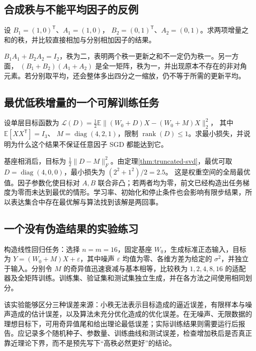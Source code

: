 \documentclass[UTF8,12pt,a4paper,fontset=fandol]{ctexart}
\begin{document}
\subsection{合成秩与不能平均因子的反例}

\begin{example}
设 $B_1=(1,0)^{\mathsf T}$、$A_1=(1,0)$，
$B_2=(0,1)^{\mathsf T}$、$A_2=(0,1)$。求两项增量之和的秩，并比较直接相加与分别相加因子的结果。
\end{example}
\begin{solve}
$B_1A_1+B_2A_2=I_2$，秩为二，表明两个秩一更新之和不一定仍为秩一。另一方面，
$(B_1+B_2)(A_1+A_2)$ 是全一矩阵，秩为一，并出现原本不存在的非对角元素。若分别取平均，还会整体多出四分之一缩放，仍不等于所需的更新平均。
\end{solve}

\subsection{最优低秩增量的一个可解训练任务}

\begin{example}
设单层目标函数为
$\mathcal L(D)=\frac12\mathbb E\|(W_0+D)X-(W_0+M)X\|_2^2$，
其中 $\mathbb E[XX^{\mathsf T}]=I_3$、
$M=\operatorname{diag}(4,2,1)$，限制 $\operatorname{rank}(D)\leq1$。求最小损失，并说明为什么这个结果不保证任意因子 SGD 都能达到它。
\end{example}
\begin{solve}
基座相消后，目标为 $\frac12\|D-M\|_F^2$。由定理\ref{thm:truncated-svd}，最优可取
$D=\operatorname{diag}(4,0,0)$，最小损失为 $(2^2+1^2)/2=2.5$。
这是权重空间的全局最优值。因子参数化使目标对 $A,B$ 联合非凸；若两者均为零，前文已经构造出任务梯度为零而未达到最优的情形。学习率、初始化和停止条件也会影响有限步结果，所以表达集合中存在最优解与算法找到该解是两回事。
\end{solve}

\subsection{一个没有伪造结果的实验练习}

构造线性回归任务：选择 $n=m=16$，固定基座 $W_0$，生成标准正态输入，目标为
$Y=(W_0+M)X+\varepsilon$，其中噪声 $\varepsilon$ 均值为零、各维方差为给定的 $\sigma^2$，并独立于输入。分别令 $M$ 的奇异值迅速衰减与基本相等，比较秩为 $1,2,4,8,16$ 的适配器及全矩阵训练。训练集、验证集和测试集独立生成，并在各方法之间使用相同划分。

该实验能够区分三种误差来源：小秩无法表示目标造成的逼近误差，有限样本与噪声造成的估计误差，以及算法未充分优化造成的优化误差。在无噪声、无限数据的理想目标下，可用奇异值尾和给出理论最低误差；实际训练结果则需要运行后报告。应记录多个随机种子、参数量、训练曲线和测试误差，检查增加秩后是否真正靠近理论下界，而不是预先写下“高秩必然更好”的结论。
\end{document}
